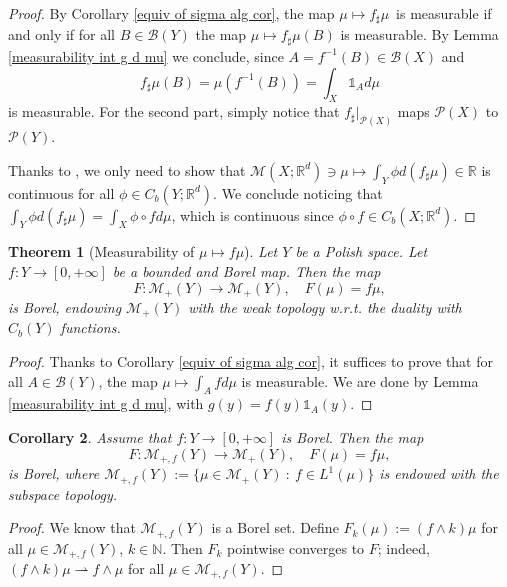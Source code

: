 \documentclass[10pt,leqno]{amsart}
\numberwithin{equation}{section}
\newtheorem{teorema}{Theorem}[section]
\newtheorem{co}[teorema]{Corollary}
\newcommand{\R}{\mathbb{R}}
\newcommand{\N}{\mathbb{N}}
\newcommand{\PP}{\mathcal{P}}
\begin{document}
\begin{proof}
    By Corollary \ref{equiv of sigma alg cor}, the map $\mu\mapsto f_\sharp  \mu $\ is measurable if and only if for all $B\in \mathcal{B}(Y)$ the map $\mu \mapsto f_\sharp \mu(B)$ is measurable. By Lemma \ref{measurability int g d mu} we conclude, since $A = f^{-1}(B) \in \mathcal{B}(X)$ and
    \[f_\sharp \mu(B) = \mu(f^{-1}(B)) = \int_X \mathds{1}_{A} d\mu\]
    is measurable. For the second part, simply notice that $f_\sharp |_{\PP(X)}$ maps $\PP(X)$ to $\PP(Y)$. 

    Thanks to \cite[Proposition 3.2]{brezis2011functional}, we only need to show that $\mathcal{M}(X;\R^d)\ni \mu \mapsto \int_Y \phi d(f_\sharp \mu) \in \R $ is continuous for all $\phi \in C_b(Y;\R^d)$. We conclude noticing that $\int_Y \phi d(f_\sharp \mu) = \int_X \phi \circ f d\mu$, which is continuous since $\phi \circ f \in C_b(X;\R^d)$.
\end{proof}




\begin{teorema}[Measurability of $\mu \mapsto f\mu$]
    Let $Y$ be a Polish space. Let $f:Y\to [0,+\infty]$ be a bounded and Borel map. Then the map
    \[F:\mathcal{M}_+(Y) \to \mathcal{M}_+(Y), \quad F(\mu) = f\mu,\]
    is Borel, endowing $\mathcal{M}_+(Y)$ with the weak topology w.r.t. the duality with $C_b(Y)$ functions.
\end{teorema}

\begin{proof}
    Thanks to Corollary \ref{equiv of sigma alg cor}, it suffices to prove that for all $A \in \mathcal{B}(Y)$, the map 
    $\mu \mapsto \int_A fd\mu$
    is measurable. We are done by Lemma \ref{measurability int g d mu}, with $g(y) = f(y) \mathds{1}_A(y)$.
\end{proof}

\begin{co}
    Assume that $f:Y \to [0,+\infty]$ is Borel. Then the map
    \[F:\mathcal{M}_{+,f}(Y) \to \mathcal{M}_+(Y), \quad F(\mu) = f\mu,\]
    is Borel, where $\mathcal{M}_{+,f}(Y):=\{\mu \in \mathcal{M}_+(Y) \ : \ f\in L^1(\mu)\}$ is endowed with the subspace topology.
\end{co}

\begin{proof}
    We know that $\mathcal{M}_{+,f}(Y)$ is a Borel set. Define $F_k(\mu):= (f\wedge k) \mu $ for all $\mu \in \mathcal{M}_{+,f}(Y)$, $k\in \N$. Then $F_k$ pointwise converges to $F$; indeed, $(f\wedge k) \mu \rightharpoonup f\wedge \mu$ for all $\mu \in \mathcal{M}_{+,f}(Y)$.
\end{proof}
\end{document}
